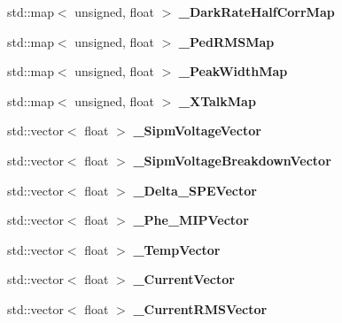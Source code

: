 \begin{DoxyCompactItemize}
\item 
std\-::map$<$ unsigned, float $>$ {\bfseries \-\_\-\-Dark\-Rate\-Half\-Corr\-Map}\label{classCALICE_1_1SiPmPropertiesProcessor_a87fcb0172fd11803f6df6d98d4263481}

\item 
std\-::map$<$ unsigned, float $>$ {\bfseries \-\_\-\-Ped\-R\-M\-S\-Map}\label{classCALICE_1_1SiPmPropertiesProcessor_a6a9b968b7530a1395cce90166158ffdb}

\item 
std\-::map$<$ unsigned, float $>$ {\bfseries \-\_\-\-Peak\-Width\-Map}\label{classCALICE_1_1SiPmPropertiesProcessor_aa7a3db0ca5b0c1814fdc1dfdc8a4b69f}

\item 
std\-::map$<$ unsigned, float $>$ {\bfseries \-\_\-\-X\-Talk\-Map}\label{classCALICE_1_1SiPmPropertiesProcessor_a38d20696ef1e2cb20b0bf86f2351b0d8}

\item 
std\-::vector$<$ float $>$ {\bfseries \-\_\-\-Sipm\-Voltage\-Vector}\label{classCALICE_1_1SiPmPropertiesProcessor_ac8b3a5950031ca74ab882c224042e451}

\item 
std\-::vector$<$ float $>$ {\bfseries \-\_\-\-Sipm\-Voltage\-Breakdown\-Vector}\label{classCALICE_1_1SiPmPropertiesProcessor_a633aa5eb479e59866e21f038d1428dad}

\item 
std\-::vector$<$ float $>$ {\bfseries \-\_\-\-Delta\-\_\-\-S\-P\-E\-Vector}\label{classCALICE_1_1SiPmPropertiesProcessor_a59e24efe83279c1ad2d35f4a0ff47978}

\item 
std\-::vector$<$ float $>$ {\bfseries \-\_\-\-Phe\-\_\-\-M\-I\-P\-Vector}\label{classCALICE_1_1SiPmPropertiesProcessor_a8735696ed23d99a31fe78b9458ca6ea4}

\item 
std\-::vector$<$ float $>$ {\bfseries \-\_\-\-Temp\-Vector}\label{classCALICE_1_1SiPmPropertiesProcessor_a062963e5878e6510f5e05ed477f0d7b5}

\item 
std\-::vector$<$ float $>$ {\bfseries \-\_\-\-Current\-Vector}\label{classCALICE_1_1SiPmPropertiesProcessor_ac4b06cb71b779bc05186055e15e4d76b}

\item 
std\-::vector$<$ float $>$ {\bfseries \-\_\-\-Current\-R\-M\-S\-Vector}\label{classCALICE_1_1SiPmPropertiesProcessor_a048c286afd43ffe74a8a00f17ab1052b}


\end{DoxyCompactItemize}
